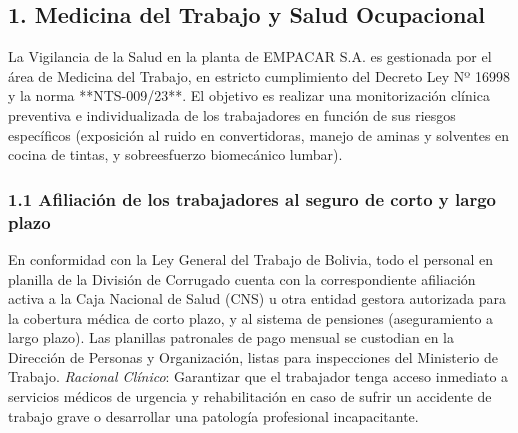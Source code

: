 \documentclass[11pt, letterpaper]{article}
\begin{document}
\subsection{1. Medicina del Trabajo y Salud Ocupacional}

La Vigilancia de la Salud en la planta de EMPACAR S.A. es gestionada por el área de Medicina del Trabajo, en estricto cumplimiento del Decreto Ley Nº 16998 y la norma **NTS-009/23**. El objetivo es realizar una monitorización clínica preventiva e individualizada de los trabajadores en función de sus riesgos específicos (exposición al ruido en convertidoras, manejo de aminas y solventes en cocina de tintas, y sobreesfuerzo biomecánico lumbar).

\subsubsection{1.1 Afiliación de los trabajadores al seguro de corto y largo plazo}
En conformidad con la Ley General del Trabajo de Bolivia, todo el personal en planilla de la División de Corrugado cuenta con la correspondiente afiliación activa a la Caja Nacional de Salud (CNS) u otra entidad gestora autorizada para la cobertura médica de corto plazo, y al sistema de pensiones (aseguramiento a largo plazo). Las planillas patronales de pago mensual se custodian en la Dirección de Personas y Organización, listas para inspecciones del Ministerio de Trabajo. \textit{Racional Clínico}: Garantizar que el trabajador tenga acceso inmediato a servicios médicos de urgencia y rehabilitación en caso de sufrir un accidente de trabajo grave o desarrollar una patología profesional incapacitante.
\end{document}
